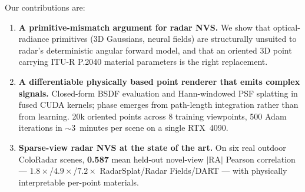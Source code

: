 Our contributions are:
\begin{enumerate}[leftmargin=*,itemsep=2pt]
\item \textbf{A primitive-mismatch argument for radar NVS.} We show that optical-radiance primitives (3D Gaussians, neural fields) are structurally unsuited to radar's deterministic angular forward model, and that an oriented 3D point carrying ITU-R P.2040 material parameters is the right replacement.
\item \textbf{A differentiable physically based point renderer that emits complex signals.} Closed-form BSDF evaluation and Hann-windowed PSF splatting in fused CUDA kernels; phase emerges from path-length integration rather than from learning. 20k oriented points across 8 training viewpoints, 500 Adam iterations in ${\sim}$3~minutes per scene on a single RTX~4090.
\item \textbf{Sparse-view radar NVS at the state of the art.} On six real outdoor ColoRadar scenes, \textbf{0.587} mean held-out novel-view $|\mathrm{RA}|$ Pearson correlation --- $1.8\times$/$4.9\times$/$7.2\times$ RadarSplat/Radar Fields/DART --- with physically interpretable per-point materials.
\end{enumerate}
